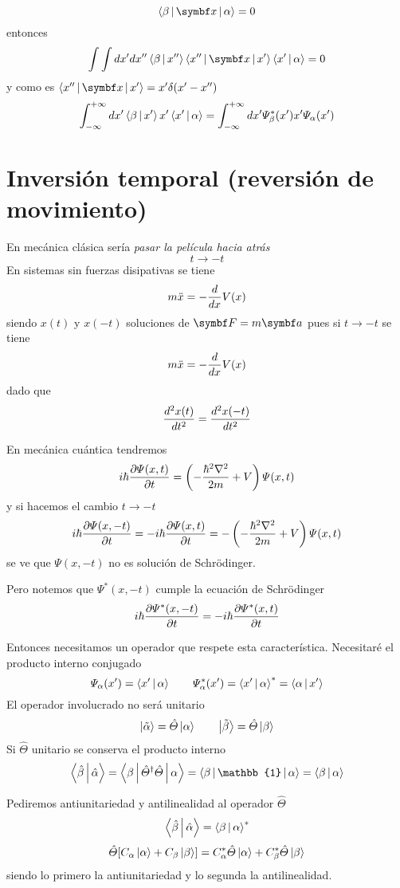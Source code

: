 \documentclass[10pt,oneside]{CBFT_book}
\begin{document}
\[
	\Braket{\beta|\vb{x}|\alpha} = 0 
\]
entonces
\[
	\int\int dx'dx''\Braket{\beta|x''}\Braket{x''|\vb{x}|x'}\Braket{x'|\alpha}= 0
\]
y como es $\Braket{x''|\vb{x}|x'} = x' \delta(x' -x'')$
\[
	\int_{-\infty}^{+\infty} dx'\Braket{\beta|x'} x' \Braket{x'|\alpha} =
	\int_{-\infty}^{+\infty} dx'\Psi_\beta^*(x') x' \Psi_\alpha (x')
\]

\section{Inversión temporal (reversión de movimiento)}


En mecánica clásica sería {\it pasar la película hacia atrás}
\[
	t \longrightarrow -t
\]
En sistemas sin fuerzas disipativas se tiene 
\[
	m \ddot{x} = - \dtot{}{x} V(x)
\]
siendo $x(t)$ y $x(-t)$ soluciones de $\vb{F} = m\vb{a}$ pues si $t\to-t$ se tiene
\[
	m \ddot{x} = - \dtot{}{x} V(x)
\]
dado que 
\[
	\dtot[2]{x(t)}{t} = \dtot[2]{x(-t)}{t}
\]

En mecánica cuántica tendremos 
\[
	i \hbar \dpar{\Psi(x,t)}{t} = \left( -\frac{\hbar^2\nabla^2}{2m} + V \right)\Psi(x,t)
\]
y si hacemos el cambio $t\to -t$
\[
	i \hbar \dpar{\Psi(x,-t)}{t} = -i \hbar \dpar{\Psi(x,t)}{t}  = 
	- \left( -\frac{\hbar^2\nabla^2}{2m} + V \right)\Psi(x,t)
\]
se ve que $\Psi(x,-t)$ no es solución de Schrödinger. 

Pero notemos que $\Psi^*(x,-t)$ cumple la ecuación de Schrödinger
\[
	i \hbar \dpar{\Psi^*(x,-t)}{t} = -i \hbar \dpar{\Psi^*(x,t)}{t} 
\]

Entonces necesitamos un operador que respete esta característica.
Necesitaré el producto interno conjugado 
\[
	\Psi_\alpha(x') = \Braket{x'|\alpha} \qquad
	\Psi^*_\alpha(x') = \Braket{x'|\alpha}^* = \Braket{\alpha|x'}
\]
El operador involucrado no será unitario 
\[
	\Ket{\tilde{\alpha}} = \hat{\Theta}\Ket{\alpha} \qquad 
	\Ket{\tilde{\beta}} = \hat{\Theta}\Ket{\beta}
\]
Si $\hat{\Theta}$ unitario se conserva el producto interno 
\[
	\Braket{\hat{\beta}|\hat{\alpha}} = 
	\Braket{\beta|\hat{\Theta}^\dagger\hat{\Theta}|\alpha} =
	\Braket{\beta|\mathbb{1}|\alpha} = \Braket{\beta|\alpha}
\]

Pediremos antiunitariedad y antilinealidad al operador $\hat{\Theta}$
\[
	\Braket{\hat{\beta}|\hat{\alpha}} = \Braket{{\beta}|{\alpha}}^*
\]
\[
	\hat{\Theta}[ C_\alpha\Ket{\alpha} + C_\beta\Ket{\beta}] = 
	C_\alpha^*\hat{\Theta}\Ket{\alpha} + C_\beta^*\hat{\Theta}\Ket{\beta}
\]
siendo lo primero la antiunitariedad y lo segunda la antilinealidad.
\end{document}
